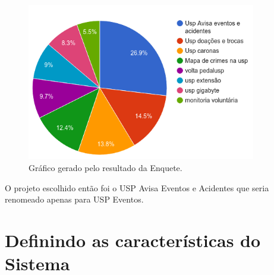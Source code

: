 \begin{figure}[htb]
\includegraphics[width=10cm]{figuras/poll_chart}
\caption{\label{fig:poll_chart} Gráfico gerado pelo resultado da Enquete.}
\end{figure}
\par O projeto escolhido então foi o USP Avisa Eventos e Acidentes que seria renomeado apenas para USP Eventos.
\section{Definindo as características do Sistema}
